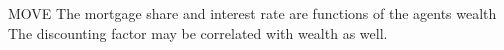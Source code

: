 
MOVE The mortgage share and interest rate are functions of the agents wealth %
The discounting factor may be correlated with wealth as well. 

%
%


